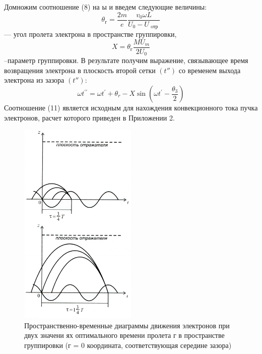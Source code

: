 Домножим соотношение (8) на ы и введем следующие величины:
\begin{equation}
	\theta _ { \text{г} } = \frac { 2 m } { e } \frac { v _ { 0 } \omega L } { U _ { 0 } - U _ { \text{ oтр } } }
\end{equation}— угол пролета электрона в пространстве группировки,
\begin{equation}
	X = \theta _ { \text{г} } \frac{M U _ { m } } { 2 U _ { 0 } }
\end{equation}--параметр группировки. В результате получим выражение, связывающее
время возвращения электрона в плоскость второй сетки $(t'' )$ со временем
выхода электрона из зазора $(t'')$:
\begin{equation}
	\omega t ^ { \prime \prime } = \omega t ^ { \prime } + \theta _ { r } - X \sin \left( \omega t ^ { \prime } - \frac { \theta _ { 3 } } { 2 } \right)
\end{equation}
Соотношение (11) является исходным для нахождения конвекционного
тока пучка электронов, расчет которого приведен в Приложении 2.

\begin{figure}[h!]
	\centering
	\includegraphics[width=0.5\textwidth]{fig/fig3}
	\caption{Пространственно-временные диаграммы движения электронов при двух значени­
ях оптимального времени пролета г в пространстве группировки (г = 0 координата,
соответствующая середине зазора)}
	\label{fig:3}
\end{figure}


